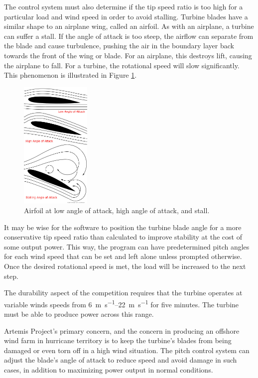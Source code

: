 \documentclass[11pt,letterpaper,conference]{IEEEtran}
\begin{document}
The control system must also determine if the tip speed ratio is too high for a
particular load and wind speed in order to avoid stalling. Turbine blades have
a similar shape to an airplane wing, called an airfoil. As with an airplane, a
turbine can suffer a stall. If the angle of attack is too steep, the airflow
can separate from the blade and cause turbulence, pushing the air in the
boundary layer back towards the front of the wing or blade. For an airplane,
this destroys lift, causing the airplane to fall. For a turbine, the rotational
speed will slow significantly. This phenomenon is illustrated in
Figure \ref{img:stall}.

\begin{figure}[th]
    \centering
    \includegraphics[width=0.3\textwidth]{images/stall.jpg}
    \caption{Airfoil at low angle of attack, high angle of attack, and
        stall\cite{stall}.}
    \label{img:stall}
\end{figure}

It may be wise for the software to position the turbine blade angle for a
more conservative tip speed ratio than calculated to improve stability at the
cost of some output power. This way, the program can have predetermined pitch
angles for each wind speed that can be set and left alone unless prompted
otherwise. Once the desired rotational speed is met, the load will be
increased to the next step.

The durability aspect of the competition requires that the turbine operates at
variable winds speeds from \qtyrange{6}{22}{\m\per\s} for five minutes. The
turbine must be able to produce power across this range.

Artemis Project's primary concern, and the concern in producing an offshore
wind farm in hurricane territory is to keep the turbine's blades from being
damaged or even torn off in a high wind situation. The pitch control system can
adjust the blade's angle of attack to reduce speed and avoid damage in such
cases, in addition to maximizing power output in normal conditions.
\end{document}
